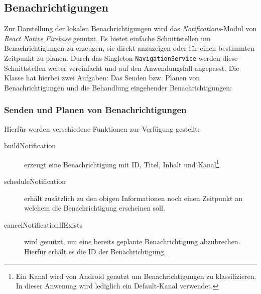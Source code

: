 \subsection{Benachrichtigungen}\label{sec:besonderheiten-benachrichtigung}
Zur Darstellung der lokalen Benachrichtigungen wird das \emph{Notifications}-Modul von \emph{React Native Firebase} genutzt.
Es bietet einfache Schnittstellen um Benachrichtigungen zu erzeugen,
sie direkt anzuzeigen oder für einen bestimmten Zeitpunkt zu planen.
Durch das Singleton \texttt{NavigationService} werden diese Schnittstellen weiter vereinfacht und auf den Anwendungsfall angepasst.
Die Klasse hat hierbei zwei Aufgaben: Das Senden bzw. Planen von Benachrichtigungen und die Behandlung eingehender Benachrichtigungen:

\subsubsection{Senden und Planen von Benachrichtigungen}
Hierfür werden verschiedene Funktionen zur Verfügung gestellt:
\begin{description}
    \item[buildNotification] erzeugt eine Benachrichtigung mit ID, Titel, Inhalt und Kanal\footnote{Ein Kanal wird von Android genutzt um Benachrichtigungen zu klassifizieren. In dieser Anwenung wird lediglich ein Default-Kanal verwendet.}.
    \item[scheduleNotification] erhält zusätzlich zu den obigen Informationen noch einen Zeitpunkt an welchem die Benachrichtigung erscheinen soll.
    \item[cancelNotificationIfExists] wird genutzt, um eine bereits geplante Benachrichtigung abzubrechen. Hierfür erhält es die ID der Benachrichtigung.
\end{description}

